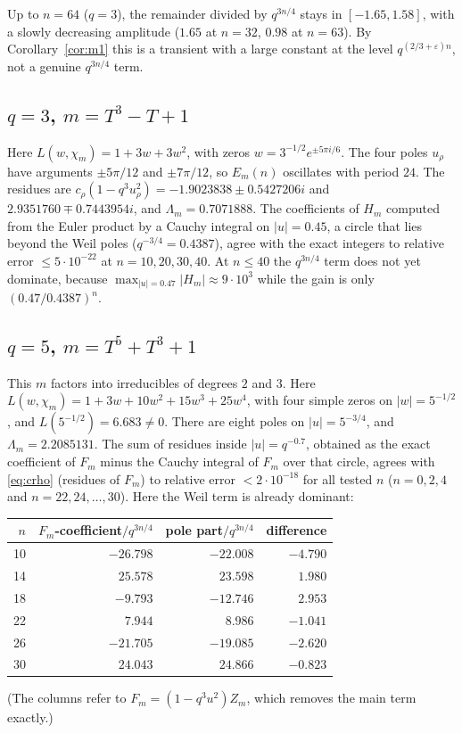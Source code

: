 \documentclass[11pt]{amsart}
\theoremstyle{remark}
\begin{document}
Up to $n=64$ ($q=3$), the remainder divided by $q^{3n/4}$ stays in $[-1.65,1.58]$, with a slowly decreasing amplitude ($1.65$ at $n=32$, $0.98$ at $n=63$). By Corollary~\ref{cor:m1} this is a transient with a large constant at the level $q^{(2/3+\varepsilon)n}$, not a genuine $q^{3n/4}$ term.

\subsection*{$q=3$, $m=T^3-T+1$}
Here $L(w,\chi_m)=1+3w+3w^2$, with zeros $w=3^{-1/2}e^{\pm5\pi i/6}$. The four poles $u_\rho$ have arguments $\pm5\pi/12$ and $\pm7\pi/12$, so $E_m(n)$ oscillates with period $24$. The residues are $c_\rho(1-q^3u_\rho^2)=-1.9023838\pm0.5427206i$ and $2.9351760\mp0.7443954i$, and $\Lambda_m=0.7071888$. The coefficients of $H_m$ computed from the Euler product by a Cauchy integral on $|u|=0.45$, a circle that lies beyond the Weil poles ($q^{-3/4}=0.4387$), agree with the exact integers to relative error $\le5\cdot10^{-22}$ at $n=10,20,30,40$. At $n\le40$ the $q^{3n/4}$ term does not yet dominate, because $\max_{|u|=0.47}|H_m|\approx9\cdot10^3$ while the gain is only $(0.47/0.4387)^n$.

\subsection*{$q=5$, $m=T^5+T^3+1$}
This $m$ factors into irreducibles of degrees $2$ and $3$. Here $L(w,\chi_m)=1+3w+10w^2+15w^3+25w^4$, with four simple zeros on $|w|=5^{-1/2}$, and $L(5^{-1/2})=6.683\ne0$. There are eight poles on $|u|=5^{-3/4}$, and $\Lambda_m=2.2085131$. The sum of residues inside $|u|=q^{-0.7}$, obtained as the exact coefficient of $F_m$ minus the Cauchy integral of $F_m$ over that circle, agrees with \eqref{eq:crho} (residues of $F_m$) to relative error $<2\cdot10^{-18}$ for all tested $n$ ($n=0,2,4$ and $n=22,24,\dots,30$). Here the Weil term is already dominant:

\begin{center}
\begin{tabular}{rrrr}
\toprule
$n$ & $F_m$-coefficient$/q^{3n/4}$ & pole part$/q^{3n/4}$ & difference\\
\midrule
10 & $-26.798$ & $-22.008$ & $-4.790$\\
14 & $25.578$ & $23.598$ & $1.980$\\
18 & $-9.793$ & $-12.746$ & $2.953$\\
22 & $7.944$ & $8.986$ & $-1.041$\\
26 & $-21.705$ & $-19.085$ & $-2.620$\\
30 & $24.043$ & $24.866$ & $-0.823$\\
\bottomrule
\end{tabular}
\end{center}
(The columns refer to $F_m=(1-q^3u^2)Z_m$, which removes the main term exactly.)
\end{document}
